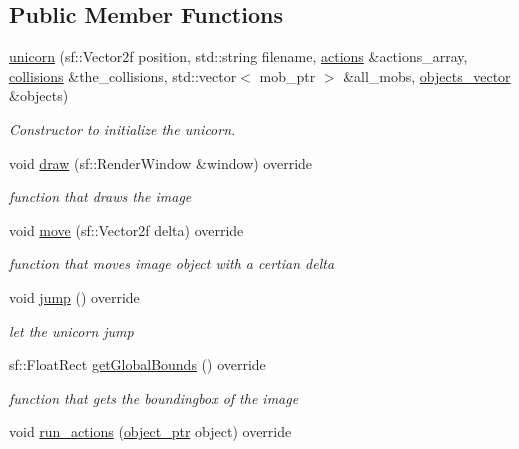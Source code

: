 \subsection*{Public Member Functions}
\begin{DoxyCompactItemize}
\item 
\hyperlink{classunicorn_a5106a69c85e9426caf0bc79f48c21ed4}{unicorn} (sf\+::\+Vector2f position, std\+::string filename, \hyperlink{drawable_8hpp_a38f93e4749e0d65d51360c429766d212}{actions} \&actions\+\_\+array, \hyperlink{drawable_8hpp_a7e1a7f34f6d09dabb4cdafd6e4118603}{collisions} \&the\+\_\+collisions, std\+::vector$<$ mob\+\_\+ptr $>$ \&all\+\_\+mobs, \hyperlink{drawable_8hpp_a6c0fdb1dfd0c34dbbdbb5dcd3c608b07}{objects\+\_\+vector} \&objects)
\begin{DoxyCompactList}\small\item\em Constructor to initialize the unicorn. \end{DoxyCompactList}\item 
void \hyperlink{classunicorn_a570c34d5669a8d2a61bdc1481e6f9dee}{draw} (sf\+::\+Render\+Window \&window) override
\begin{DoxyCompactList}\small\item\em function that draws the image \end{DoxyCompactList}\item 
void \hyperlink{classunicorn_a162f200a68342f7bc0baaf17c8cf3f9f}{move} (sf\+::\+Vector2f delta) override
\begin{DoxyCompactList}\small\item\em function that moves image object with a certian delta \end{DoxyCompactList}\item 
void \hyperlink{classunicorn_a07d5ca4e66632c0e871221a27146805a}{jump} () override
\begin{DoxyCompactList}\small\item\em let the unicorn jump \end{DoxyCompactList}\item 
sf\+::\+Float\+Rect \hyperlink{classunicorn_a1bac09fc59b04f14f5a093bc4daa04da}{get\+Global\+Bounds} () override
\begin{DoxyCompactList}\small\item\em function that gets the boundingbox of the image \end{DoxyCompactList}\item 
void \hyperlink{classunicorn_aadb47a9981c46d6add8704074df117df}{run\+\_\+actions} (\hyperlink{drawable_8hpp_aab5add95f06d2ba25dbfed8eb07274fa}{object\+\_\+ptr} object) override

\end{DoxyCompactItemize}
